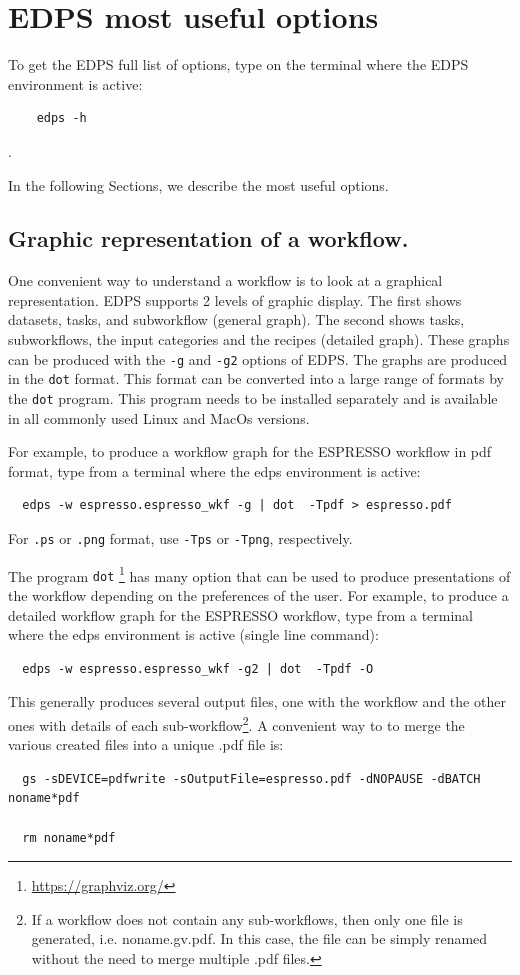 \section{EDPS most useful options}
To get the EDPS full list of options, type on the terminal where the EDPS environment is active: 
\begin{verbatim}
    edps -h
\end{verbatim}. 

In the following Sections, we describe the most useful options.

\subsection{Graphic representation of a workflow.}
\label{sec:edps_graphic}

One convenient way to understand a workflow is to look at a graphical representation. EDPS supports 2 levels of graphic display. The first shows datasets, tasks, and subworkflow (general graph). The second shows tasks, subworkflows, the input categories and the recipes (detailed graph). These graphs can be produced with the {\tt -g} and {\tt -g2} options of EDPS. The graphs are produced in the {\tt dot} format. This format can be converted into a large range of formats by the {\tt dot} program. This program needs to be installed separately and is available in all commonly used Linux and MacOs versions.

For example, to produce a workflow graph  for the ESPRESSO workflow in pdf format, type from a terminal where the edps environment is active:

\begin{verbatim}
  edps -w espresso.espresso_wkf -g | dot  -Tpdf > espresso.pdf
\end{verbatim}

For {\tt .ps} or  {\tt .png} format, use {\tt -Tps} or {\tt -Tpng}, respectively.

 The program {\tt dot} \footnote{\url{https://graphviz.org/}} has many option that can be used to produce presentations of the workflow depending on the preferences of the user. 
For example, to produce a detailed workflow graph for the ESPRESSO workflow, type from a terminal where the edps environment is active (single line command):
\begin{verbatim}
  edps -w espresso.espresso_wkf -g2 | dot  -Tpdf -O 
\end{verbatim}

This generally produces several output files, one with the workflow and the  other ones with details  of each sub-workflow\footnote{If a workflow does not contain any sub-workflows, then only one file is generated, i.e. noname.gv.pdf. In this case, the file can be simply renamed without the need to merge multiple .pdf files.}. A convenient way to to merge the various created files into a unique .pdf file is:
\begin{verbatim}
  gs -sDEVICE=pdfwrite -sOutputFile=espresso.pdf -dNOPAUSE -dBATCH noname*pdf
  
  rm noname*pdf
\end{verbatim}


